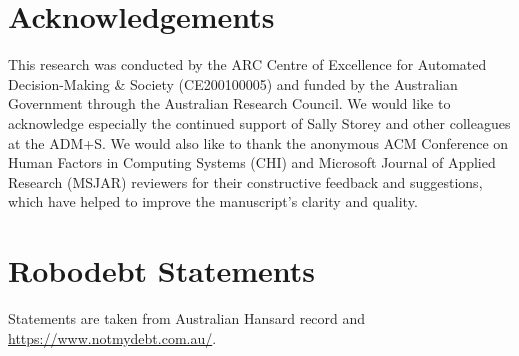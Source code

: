 \documentclass{article}
\begin{document}
\section{Acknowledgements}

This research was conducted by the ARC Centre of Excellence for Automated Decision-Making \& Society (CE200100005) and  funded by the Australian Government through the Australian Research Council. We would like to acknowledge especially the continued support of Sally Storey and other colleagues at the ADM+S. We would also like to thank the anonymous ACM Conference on Human Factors in Computing Systems (CHI) and Microsoft Journal of Applied Research (MSJAR) reviewers for their constructive feedback and suggestions, which have helped to improve the manuscript's clarity and quality. 






\appendix
\section{Robodebt Statements}\label{appendix-1-statements}

Statements are taken from Australian Hansard record and \url{https://www.notmydebt.com.au/}.
\end{document}
